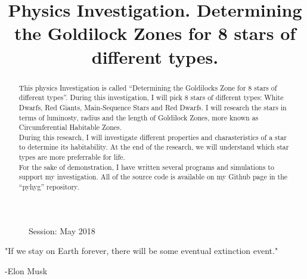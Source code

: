 \documentclass{article}
\title{Physics Investigation. Determining the Goldilock Zones for 8 stars of different types. }
\date{}
\author{}
\begin{document}
\maketitle

\onehalfspacing

\begin{figure}
  \begin{flushleft}
    Session: May 2018\\
    \end{flushleft}
  \end{figure}




\begin{center}
  "If we stay on Earth forever, there will be some eventual extinction event." 
\end{center}
\begin{flushright}
  -Elon Musk \cite{musk}
\end{flushright}


\begin{abstract}
  This physics Investigation is called ``Determining the Goldilocks Zone for 8 stars of different types''.
  During this investigation, I will pick 8 stars of different types: White Dwarfs, Red Giants, Main-Sequence Stars and Red Dwarfs.
  I will research the stars in terms of luminosty, radius and the length of Goldilock Zones, more known as Circumferential Habitable Zones.\\
  
  During this research, I will investigate different properties and charasteristics of a star to determine its habitability.
  At the end of the research, we will understand which star types are more preferrable for life.\\
  
  For the sake of demonstration, I have written several programs and simulations to support my investigation. All of the source code is available on my Github page in the ``pyhyg'' repository. \cite{github}\\
  
\end{abstract}
\end{document}
